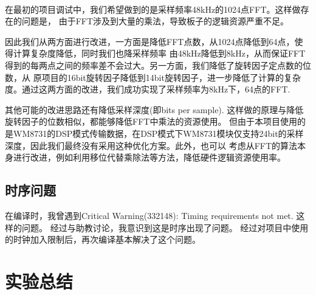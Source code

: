 \documentclass[12pt]{article}
\begin{document}
\paragraph{}在最初的项目调试中，我们希望做到的是采样频率48kHz的1024点FFT。这样做存在的问题是，
由于FFT涉及到大量的乘法，导致板子的逻辑资源严重不足。

因此我们从两方面进行改进，一方面是降低FFT点数，从1024点降低到64点，使得计算复杂度降低，同时我们也降采样频率
由48kHz降低到8kHz，从而保证FFT得到的每两点之间的频率差不会过大。另一方面，我们降低了旋转因子定点数的位数，从
原项目的16bit旋转因子降低到14bit旋转因子，进一步降低了计算的复杂度。通过这两方面的改进，我们成功实现了采样频率为8kHz下，64点的FFT.

其他可能的改进思路还有降低采样深度(即bits per sample). 这样做的原理与降低旋转因子的位数相似，都能够降低FFT中乘法的资源使用。
但由于本项目使用的是WM8731的DSP模式传输数据，在DSP模式下WM8731模块仅支持24bit的采样深度，因此我们最终没有采用这种优化方案。此外，也可以
考虑从FFT的算法本身进行改进，例如利用移位代替乘除法等方法，降低硬件逻辑资源使用率。

\subsection{时序问题}
在编译时，我曾遇到Critical Warning(332148): Timing requirements not met. 这样的问题。
经过与助教讨论，我意识到这是时序出现了问题。
经过对项目中使用的时钟加入限制后，再次编译基本解决了这个问题。

\section{实验总结}
\end{document}
